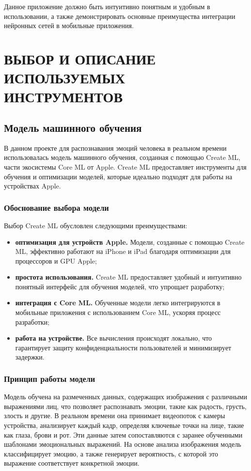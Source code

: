 {Данное приложение должно быть интуитивно понятным и удобным в использовании, а также демонстрировать основные преимущества интеграции нейронных сетей в мобильные приложения.

\newpage
  
\section{\MakeUppercase{Выбор и описание используемых инструментов}}
{
    \subsection{Модель машинного обучения}
    В данном проекте для распознавания эмоций человека в реальном времени использовалась модель машинного обучения, созданная с помощью Create ML, части экосистемы Core ML от Apple. Create ML предоставляет инструменты для обучения и оптимизации моделей, которые идеально подходят для работы на устройствах Apple.

\subsubsection*{Обоснование выбора модели}
Выбор Create ML обусловлен следующими преимуществами:
\begin{itemize}
    \item \textbf{оптимизация для устройств Apple.} Модели, созданные с помощью Create ML, эффективно работают на iPhone и iPad благодаря оптимизации для процессоров и GPU Apple;
    \item \textbf{простота использования.} Create ML предоставляет удобный и интуитивно понятный интерфейс для обучения моделей, что упрощает разработку;
    \item \textbf{интеграция с Core ML.} Обученные модели легко интегрируются в мобильные приложения с использованием Core ML, ускоряя процесс разработки;
    \item \textbf{работа на устройстве.} Все вычисления происходят локально, что гарантирует защиту конфиденциальности пользователей и минимизирует задержки.
\end{itemize}

\subsubsection*{Принцип работы модели}

Модель обучена на размеченных данных, содержащих изображения с различными выражениями лиц, что позволяет распознавать эмоции, такие как радость, грусть, злость и другие. В реальном времени она принимает видеопоток с камеры устройства, анализирует каждый кадр, определяя ключевые точки на лице, такие как глаза, брови и рот. Эти данные затем сопоставляются с заранее обученными шаблонами эмоциональных выражений. На основе анализа изображения модель классифицирует эмоцию, а также генерирует вероятность, с которой это выражение соответствует конкретной эмоции.

}}
